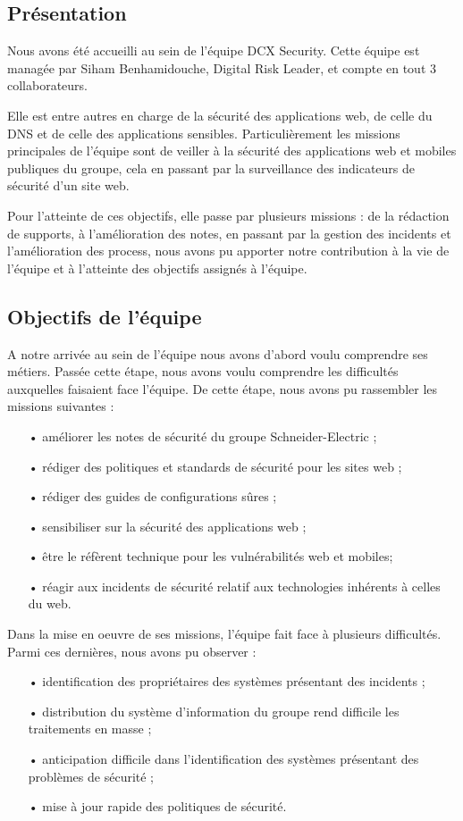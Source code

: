 \documentclass[a4paper,12pt]{book}
\theoremstyle{break}
\begin{document}
\subsection{Présentation}
Nous avons été accueilli au sein de l’équipe DCX Security. Cette équipe est managée par Siham Benhamidouche, Digital Risk Leader, et compte en tout 3 collaborateurs.


Elle est entre autres en charge de la sécurité des applications web, de celle du DNS et de celle des applications sensibles. 
\newline Particulièrement les missions principales de l’équipe sont de veiller à la sécurité des applications web et mobiles publiques du groupe, cela en passant par la surveillance des indicateurs de sécurité d’un site web.


Pour l’atteinte de ces objectifs, elle passe par plusieurs missions : de la rédaction de supports, à l’amélioration des notes, en passant par la gestion des incidents et l’amélioration des process, nous avons pu apporter notre contribution à la vie de l’équipe et à l’atteinte des objectifs assignés à l’équipe. 


\subsection{Objectifs de l'équipe}
A notre arrivée au sein de l'équipe nous avons d’abord voulu comprendre ses métiers. Passée cette étape, nous avons voulu comprendre les difficultés auxquelles faisaient face l’équipe. De cette étape, nous avons pu rassembler les missions suivantes : 
\begin{itemize}
    \item[•] améliorer les notes de sécurité du groupe Schneider-Electric ; 
    \item[•] rédiger des politiques et standards de sécurité pour les sites web ;
    \item[•] rédiger des guides de configurations sûres ;
    \item[•] sensibiliser sur la sécurité des applications web ; 
    \item[•] être le réfèrent technique pour les vulnérabilités web et mobiles; 
    \item[•] réagir aux incidents de sécurité relatif aux technologies inhérents à celles du web.
\end{itemize}
Dans la mise en oeuvre de ses missions, l'équipe fait face à plusieurs difficultés. Parmi ces dernières, nous avons pu observer :
\begin{itemize}
   \item[•] identification des propriétaires des systèmes présentant des incidents ;
   \item[•] distribution du système d’information du groupe rend difficile les traitements en masse ; 
   \item[•] anticipation difficile dans l’identification des systèmes présentant des problèmes de sécurité ;
   \item[•] mise à jour rapide des politiques de sécurité.
\end{itemize}
\end{document}

